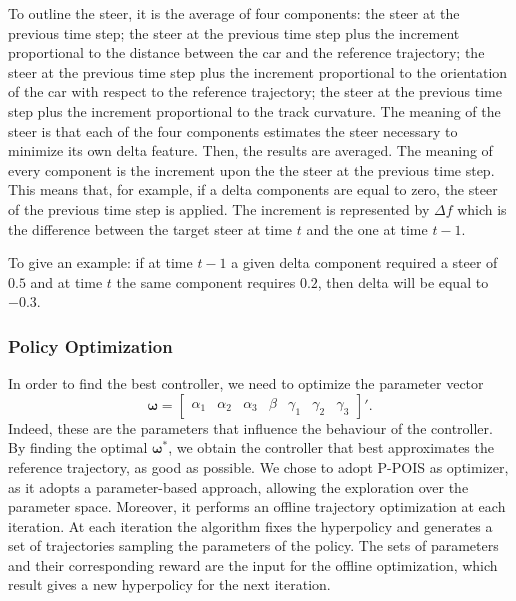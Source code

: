 To outline the steer, it is the average of four components: the steer at the previous time step; the steer at the previous time step plus the increment proportional to the distance between the car and the reference trajectory; the steer at the previous time step plus the increment proportional to the orientation of the car with respect to the reference trajectory; the steer at the previous time step plus the increment proportional to the track curvature.
The meaning of the steer is that each of the four components estimates the steer necessary to minimize its own delta feature. Then, the results are averaged. The meaning of every component is the increment upon the the steer at the previous time step.
This means that, for example, if a delta components are equal to zero, the steer of the previous time step is applied. The increment is represented by $\Delta f$ which is the difference between the target steer at time $t$ and the one at time $t-1.$

To give an example: if at time $t-1$ a given delta component required a steer of $0.5$ and at time $t$ the same component requires $0.2$, then delta will be equal to $-0.3.$






\subsubsection{Policy Optimization}
In order to find the best controller, we need to optimize the parameter vector 
\[
\boldsymbol \omega= 
\begin{bmatrix}
\alpha_1  & \alpha_2 & \alpha_3 & \beta & \gamma_1 & \gamma_2 & \gamma_3
\end{bmatrix}'.
\]
Indeed, these are the parameters that influence the behaviour of the controller. By finding the optimal $\boldsymbol \omega^*$, we obtain the controller that best approximates the reference trajectory, as good as possible.
We chose to adopt P-POIS as optimizer, as it adopts a parameter-based approach, allowing the exploration over the parameter space.
Moreover, it performs an offline trajectory optimization at each iteration. At each iteration the algorithm fixes the hyperpolicy and generates a set of trajectories sampling the parameters of the policy. The sets of parameters and their corresponding reward are the input for the offline optimization, which result gives a new hyperpolicy for the next iteration.


